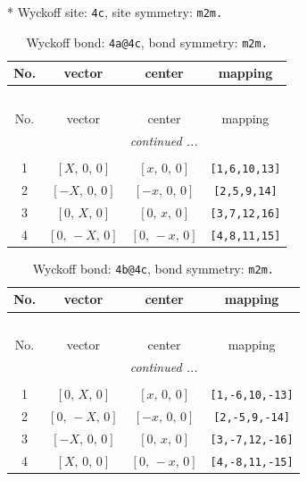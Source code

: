 \documentclass[fleqn,8pt]{jsarticle}
\begin{document}
* Wyckoff site: {\tt 4c}, site symmetry: {\tt m2m.}
\renewcommand{\arraystretch}{1.2}
\begin{longtable}{cccc}
\caption{Wyckoff bond: {\tt 4a@4c}, bond symmetry: {\tt m2m.}}
 \\
 \hline \hline
No. & vector & center & mapping \\ \hline \endfirsthead

\multicolumn{3}{l}{\tablename\ \thetable{}} \\
 \hline \hline
No. & vector & center & mapping \\ \hline \endhead

 \hline \hline
\multicolumn{3}{r}{\footnotesize\it continued ...} \\ \endfoot

 \hline \hline
\multicolumn{3}{r}{} \\ \endlastfoot

1 & $\left[ X,\, 0,\, 0 \right]$ & $\left[ x,\, 0,\, 0 \right]$ & {\tt [1,6,10,13]} \\ \hline
2 & $\left[ - X,\, 0,\, 0 \right]$ & $\left[ - x,\, 0,\, 0 \right]$ & {\tt [2,5,9,14]} \\ \hline
3 & $\left[ 0,\, X,\, 0 \right]$ & $\left[ 0,\, x,\, 0 \right]$ & {\tt [3,7,12,16]} \\ \hline
4 & $\left[ 0,\, - X,\, 0 \right]$ & $\left[ 0,\, - x,\, 0 \right]$ & {\tt [4,8,11,15]} \\
\end{longtable}
\renewcommand{\arraystretch}{1.2}
\begin{longtable}{cccc}
\caption{Wyckoff bond: {\tt 4b@4c}, bond symmetry: {\tt m2m.}}
 \\
 \hline \hline
No. & vector & center & mapping \\ \hline \endfirsthead

\multicolumn{3}{l}{\tablename\ \thetable{}} \\
 \hline \hline
No. & vector & center & mapping \\ \hline \endhead

 \hline \hline
\multicolumn{3}{r}{\footnotesize\it continued ...} \\ \endfoot

 \hline \hline
\multicolumn{3}{r}{} \\ \endlastfoot

1 & $\left[ 0,\, X,\, 0 \right]$ & $\left[ x,\, 0,\, 0 \right]$ & {\tt [1,-6,10,-13]} \\ \hline
2 & $\left[ 0,\, - X,\, 0 \right]$ & $\left[ - x,\, 0,\, 0 \right]$ & {\tt [2,-5,9,-14]} \\ \hline
3 & $\left[ - X,\, 0,\, 0 \right]$ & $\left[ 0,\, x,\, 0 \right]$ & {\tt [3,-7,12,-16]} \\ \hline
4 & $\left[ X,\, 0,\, 0 \right]$ & $\left[ 0,\, - x,\, 0 \right]$ & {\tt [4,-8,11,-15]} \\
\end{longtable}
\end{document}
